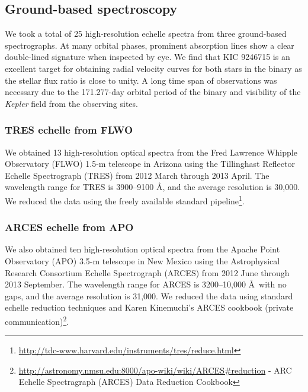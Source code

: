 \subsection{Ground-based spectroscopy}\label{spectra}
We took a total of 25 high-resolution echelle spectra from three ground-based spectrographs. At many orbital phases, prominent absorption lines show a clear double-lined signature when inspected by eye. We find that KIC 9246715 is an excellent target for obtaining radial velocity curves for both stars in the binary as the stellar flux ratio is close to unity. A long time span of observations was necessary due to the 171.277-day orbital period of the binary and visibility of the \emph{Kepler} field from the observing sites.

\subsubsection{TRES echelle from FLWO}\label{tres}
We obtained 13 high-resolution optical spectra from the Fred Lawrence Whipple Observatory (FLWO) 1.5-m telescope in Arizona using the Tillinghast Reflector Echelle Spectrograph (TRES) from 2012 March through 2013 April. The wavelength range for TRES is 3900--9100 \AA, and the average resolution is 30,000. We reduced the data using the freely available standard pipeline\footnote{\url{http://tdc-www.harvard.edu/instruments/tres/reduce.html}}.

\subsubsection{ARCES echelle from APO}\label{arces}
We also obtained ten high-resolution optical spectra from the Apache Point Observatory (APO) 3.5-m telescope in New Mexico using the Astrophysical Research Consortium Echelle Spectrograph (ARCES) from 2012 June through 2013 September. The wavelength range for ARCES is 3200--10,000 \AA \ with no gaps, and the average resolution is 31,000. We reduced the data using standard echelle reduction techniques and Karen Kinemuchi's ARCES cookbook (private communication)\footnote{\url{http://astronomy.nmsu.edu:8000/apo-wiki/wiki/ARCES#reduction} - ARC Echelle Spectragraph (ARCES) Data Reduction Cookbook}.

